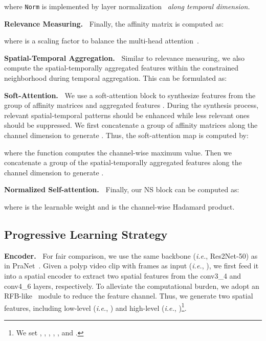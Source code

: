 \documentclass[runningheads]{llncs}
\def\ie{\emph{i.e.}}
\newcommand{\myPara}[1]{\noindent\textbf{#1~}}
\begin{document}
where \texttt{Norm} is implemented by layer normalization~\cite{ba2016layer} \textit{along temporal dimension.}

\myPara{Relevance Measuring.} Finally, the affinity matrix is computed as:

where  is a scaling factor to balance the multi-head attention~\cite{vaswani2017attention}.

\myPara{Spatial-Temporal Aggregation.}
Similar to relevance measuring, we also compute the spatial-temporally aggregated features  within the constrained neighborhood during temporal aggregation.
This can be formulated as:


\myPara{Soft-Attention.}
We use a soft-attention block to synthesize features from the group of 
affinity matrices  and aggregated features .
During the synthesis process, relevant spatial-temporal patterns should be enhanced 
while less relevant ones should be suppressed.
We first concatenate a group of affinity matrices  along the channel dimension to generate .
Thus, the soft-attention map  is computed by:

where the  function computes the channel-wise maximum value.
Then we concatenate a group of the spatial-temporally aggregated features  along the channel dimension to generate .

\myPara{Normalized Self-attention.}
Finally, our NS block can be computed as:

where  is the learnable weight and  is the channel-wise Hadamard product.


















\subsection{Progressive Learning Strategy}\label{sec:pipeline}

\myPara{Encoder.}
For fair comparison, we use the same backbone (\ie, Res2Net-50) as in PraNet~\cite{fan2020pra}.
Given a polyp video clip with  frames as input (\ie, ),
we first feed it into a spatial encoder to extract two spatial features from the conv3\_4 and conv4\_6 layers, respectively.
To alleviate the computational burden, we adopt an RFB-like~\cite{liu2018receptive} module to reduce the feature channel.
Thus, we generate two spatial features, including low-level (\ie, ) and high-level (\ie, )\footnote{We set , , , , , and .}.
\end{document}
